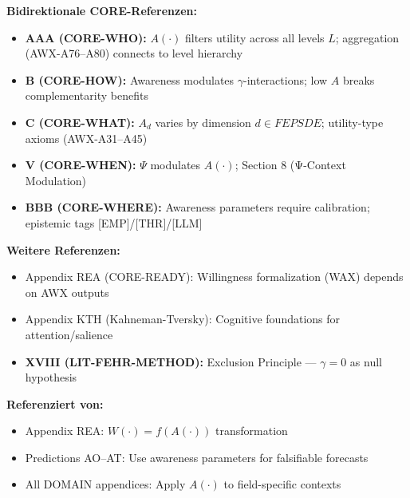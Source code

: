 \begin{tcolorbox}[colback=purple!5!white, colframe=purple!50!black, title=Cross-Reference Map: 10C CORE Integration]
\textbf{Bidirektionale CORE-Referenzen:}
\begin{itemize}[nosep]
    \item \textbf{AAA (CORE-WHO):} $A(\cdot)$ filters utility across all levels $L$; aggregation (AWX-A76--A80) connects to level hierarchy
    \item \textbf{B (CORE-HOW):} Awareness modulates $\gamma$-interactions; low $A$ breaks complementarity benefits
    \item \textbf{C (CORE-WHAT):} $A_d$ varies by dimension $d \in FEPSDE$; utility-type axioms (AWX-A31--A45)
    \item \textbf{V (CORE-WHEN):} $\Psi$ modulates $A(\cdot)$; Section 8 (Ψ-Context Modulation)
    \item \textbf{BBB (CORE-WHERE):} Awareness parameters require calibration; epistemic tags [EMP]/[THR]/[LLM]
\end{itemize}
\textbf{Weitere Referenzen:}
\begin{itemize}[nosep]
    \item Appendix REA (CORE-READY): Willingness formalization (WAX) depends on AWX outputs
    \item Appendix KTH (Kahneman-Tversky): Cognitive foundations for attention/salience
    \item \textbf{XVIII (LIT-FEHR-METHOD):} Exclusion Principle --- $\gamma = 0$ as null hypothesis
\end{itemize}
\textbf{Referenziert von:}
\begin{itemize}[nosep]
    \item Appendix REA: $W(\cdot) = f(A(\cdot))$ transformation
    \item Predictions AO--AT: Use awareness parameters for falsifiable forecasts
    \item All DOMAIN appendices: Apply $A(\cdot)$ to field-specific contexts
\end{itemize}
\end{tcolorbox}

